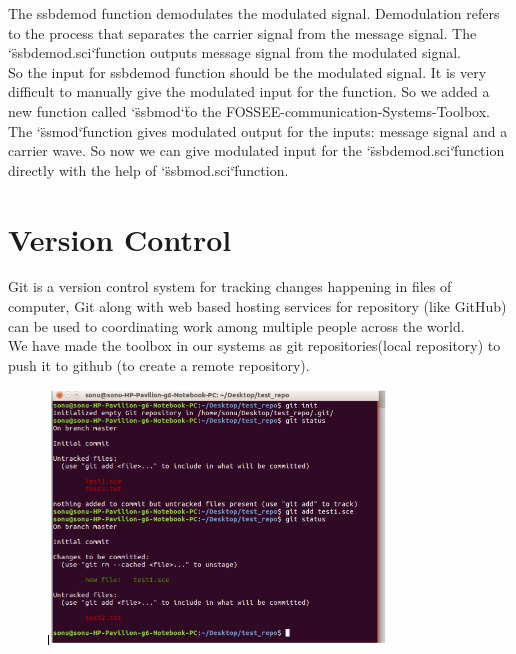\documentclass[12pt,a4paper]{report}
\begin{document}
The ssbdemod function demodulates the modulated signal. Demodulation refers to the process that separates the carrier signal from the message signal. The \char`\" ssbdemod.sci\char`\"  function outputs message signal from the modulated signal.\\

So the input for ssbdemod function should be the modulated signal. It is very difficult to manually give the modulated input for the function. So we added a new function called \char`\"ssbmod\char`\"  to the FOSSEE-communication-Systems-Toolbox. The \char`\"ssmod\char`\"  function gives modulated output for the inputs: message signal and a carrier wave. So now we can give modulated input for the  \char`\"ssbdemod.sci\char`\"  function directly with the help of  \char`\"ssbmod.sci\char`\"  function.\\






\newpage

\section{Version Control}

Git is a version control system for tracking changes happening in files of computer, Git along with web based hosting services for repository (like GitHub) can be used to coordinating work among multiple people across the world.\\
We have made the toolbox in our systems as git repositories(local repository) to push it to github (to create a remote repository).

\begin{figure}[H]
\centering
\includegraphics[width = 0.8\textwidth]{git.png}
\label{gitcommand}
\end{figure}
\end{document}
